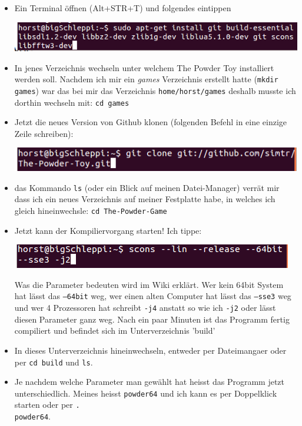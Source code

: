 \documentclass[10pt,a4paper,ngerman,twoside]{article} %
\begin{document}
\begin{multicols}{3}
\begin{itemize}
\item Ein Terminal öffnen (Alt+STR+T) und folgendes eintippen 
\begin{center}
\includegraphics[width=\linewidth]{powdertoy/zeile1.png}
\end{center}
\item In jenes Verzeichnis wechseln unter welchem The Powder Toy installiert werden soll. Nachdem ich mir ein \textit{games} Verzeichnis erstellt hatte (\texttt{mkdir games}) war das bei mir das Verzeichnis \texttt{home/horst/games} deshalb musste ich dorthin wechseln mit: \texttt{cd games}  
\item Jetzt die neues Version von Github klonen (folgenden Befehl in eine einzige Zeile schreiben):
\begin{center}
\includegraphics[width=\linewidth]{powdertoy/zeile2.png}
\end{center}
\item das Kommando \texttt{ls} (oder ein Blick auf meinen Datei-Manager) verrät mir dass ich ein neues Verzeichnis auf meiner Festplatte habe, in welches ich gleich hineinwechsle: \texttt{cd The-Powder-Game}
\item Jetzt kann der Kompiliervorgang starten! Ich tippe:
\begin{center}
\includegraphics[width=\linewidth]{powdertoy/zeile3.png}
\end{center} Was die Parameter bedeuten wird im Wiki erklärt. Wer kein 64bit System hat lässt das \texttt{--64bit} weg, wer einen alten Computer hat lässt das \texttt{--sse3} weg und wer 4 Prozessoren hat schreibt \texttt{-j4} anstatt so wie ich \texttt{-j2} oder lässt diesen Parameter ganz weg. Nach ein paar Minuten ist das Programm fertig compiliert und befindet sich im Unterverzeichnis 'build'
\item In dieses Unterverzeichnis hineinwechseln, entweder per Dateimangaer oder per \texttt{cd build} und \texttt{ls}.
\item Je nachdem welche Parameter man gewählt hat heisst das Programm jetzt unterschiedlich. Meines heisst \texttt{powder64} und ich kann es per Doppelklick starten oder per \texttt{.\\powder64}.
\end{itemize}
\end{multicols}
\end{document}
